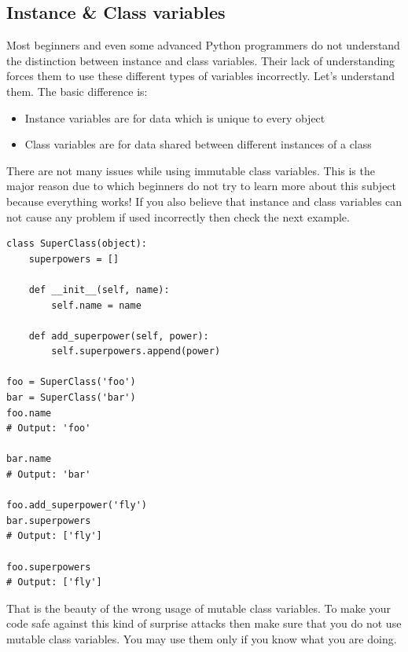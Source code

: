 \documentclass{report}
\begin{document}
    \subsection{Instance \& Class variables}
    \bigbreak \noindent 
    Most beginners and even some advanced Python programmers do not understand the distinction between instance and class variables. Their lack of understanding forces them to use these different types of variables incorrectly. Let’s understand them.
    \bigbreak \noindent 
    The basic difference is:
    \begin{itemize}
        \item Instance variables are for data which is unique to every object
        \item Class variables are for data shared between different instances of a class
    \end{itemize}
    There are not many issues while using immutable class variables. This is the major reason due to which beginners do not try to learn more about this subject because everything works! If you also believe that instance and class variables can not cause any problem if used incorrectly then check the next example.
    \bigbreak \noindent 
    \begin{verbatim}
class SuperClass(object):
    superpowers = []

    def __init__(self, name):
        self.name = name

    def add_superpower(self, power):
        self.superpowers.append(power)

foo = SuperClass('foo')
bar = SuperClass('bar')
foo.name
# Output: 'foo'

bar.name
# Output: 'bar'

foo.add_superpower('fly')
bar.superpowers
# Output: ['fly']

foo.superpowers
# Output: ['fly']
    \end{verbatim}
    That is the beauty of the wrong usage of mutable class variables. To make your code safe against this kind of surprise attacks then make sure that you do not use mutable class variables. You may use them only if you know what you are doing.

    \bigbreak \noindent \bigbreak \noindent 
\end{document}
